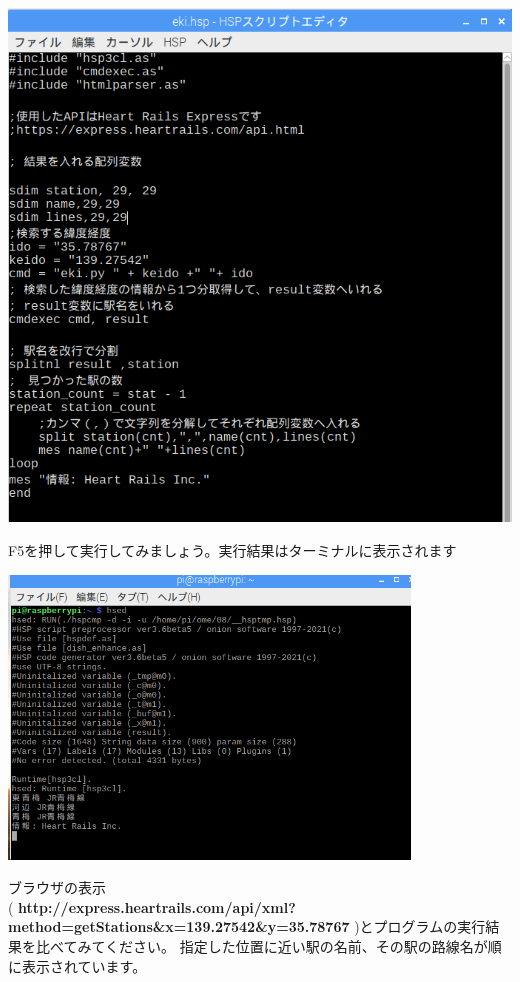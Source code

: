 \begin{center}
\includegraphics[width=13.377cm]{./text08-img/textbook-img050.png}

\end{center}

\bigskip

\clearpage
F5を押して実行してみましょう。実行結果はターミナルに表示されます



\begin{center}
\includegraphics[width=0.8\textwidth]{./text08-img/textbook-img051.png}

\end{center}
ブラウザの表示\\(
\textbf{http://express.heartrails.com/api/xml?method=getStations\&x=139.27542\&y=35.78767}
)とプログラムの実行結果を比べてみてください。
指定した位置に近い駅の名前、その駅の路線名が順に表示されています。



